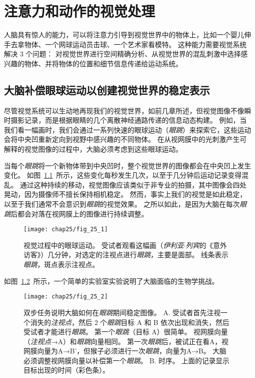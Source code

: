 \chapter{注意力和动作的视觉处理} \label{chap:chap25}

人脑具有惊人的能力，可以将注意力引导到视觉世界中的物体上，比如一个婴儿伸手去拿物体、一个网球运动员击球、一个艺术家看模特。
这种能力需要视觉系统解决 3 个问题：
对视觉世界进行空间精确分析、从视觉世界的混乱刺激中选择感兴趣的物体、并将物体的位置和细节信息传递给运动系统。



\section{大脑补偿眼球运动以创建视觉世界的稳定表示}

尽管视觉系统可以生动地再现我们的视觉世界，如前几章所述，但视觉图像不像瞬时摄影记录，而是根据眼睛的几个离散神经通路传递的信息动态构建。
例如，当我们看一幅画时，我们会通过一系列快速的眼球运动（\textit{眼跳}）来探索它，这些运动会将中央凹重新定向到视野中感兴趣的不同物体。
在从视网膜中的光刺激产生可解释的视觉图像的过程中，大脑必须考虑到这些眼球运动。


当每个\textit{眼跳}将一个新物体带到中央凹时，整个视觉世界的图像都会在中央凹上发生变化。
如图~\ref{fig:25_1}~所示，这些变化每秒发生几次，以至于几分钟后运动记录变得混乱。
通过这种持续的移动，视觉图像应该类似于非专业的拍摄，其中图像会四处晃动，因为摄像师不擅长保持相机稳定。
然而，事实上我们的视觉是如此稳定，以至于我们通常不会意识到\textit{眼跳}的视觉效果。
之所以如此，是因为大脑在每次\textit{眼跳}后都会对落在视网膜上的图像进行持续调整。


\begin{figure}[htbp]
	\centering
	\texttt{[image: chap25/fig\_25\_1]}
	\caption{视觉过程中的眼球运动。
		受试者观看这幅画（\textit{伊利亚$\cdot$列宾}的《意外访客》）几分钟，对选定的注视点进行\textit{眼跳}，主要是面部。
		线条表示\textit{眼跳}，斑点表示注视点。}
	\label{fig:25_1}
\end{figure}


如图~\ref{fig:25_2}~所示，一个简单的实验室实验说明了大脑面临的生物学挑战。


\begin{figure}[htbp]
	\centering
	\texttt{[image: chap25/fig\_25\_2]}
	\caption{双步任务说明大脑如何在\textit{眼跳}期间稳定图像。
		A. 受试者首先注视一个消失的\textit{注视点}，然后 2 个\textit{眼跳}目标 A 和 B 依次出现和消失，然后受试者才能进行\textit{眼跳}。
		第一个\textit{眼跳}（目标 A）很简单。
		视网膜向量（\textit{注视点}→A）和\textit{眼跳}向量相同。
		第一次\textit{眼跳}后，被试正在看A，视网膜向量为A→B'，但猴子必须进行一次\textit{眼跳}，向量为A→B。
		大脑必须调整视网膜向量以补偿第一个\textit{眼跳}。
		B. 时序。
		上面的记录显示目标出现的时间（彩色条）。}
	\label{fig:25_2}
\end{figure}



